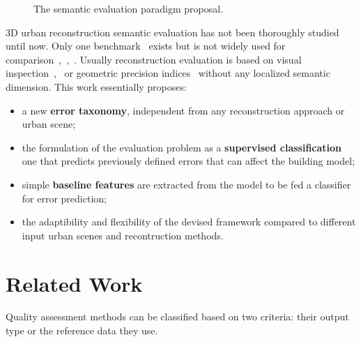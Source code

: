 \documentclass[runningheads]{llncs}
\begin{document}
    \begin{figure}
        \begin{center}
            
            \caption{\label{fig::pipeline} The semantic evaluation paradigm proposal. }
        \end{center}
    \end{figure}

     3D urban reconstruction semantic evaluation has not been thoroughly studied until now. Only one benchmark~\cite{rottensteiner2014results} exists but is not widely used for comparison~\cite{Lafarge2012},~\cite{nguatem2017modeling},~\cite{li2016boxfitting}. Usually reconstruction evaluation is based on visual inspection~\cite{Durupt2006},~\cite{MacayMoreia2013} or geometric precision indices~\cite{Kaartinen2005} without any localized semantic dimension. This work essentially proposes:
    \begin{itemize}
        \item a new \textbf{error taxonomy}, independent from any reconstruction approach or urban scene;
        \item the formulation of the evaluation problem as a \textbf{supervised classification} one that predicts previously defined errors that can affect the building model;
        \item simple \textbf{baseline features} are extracted from the model to be fed a classifier for error prediction;
        \item the adaptibility and flexibility of the devised framework compared to different input urban scenes and recontruction methods.
    \end{itemize}

\section{Related Work}

Quality assessment methods can be classified based on two criteria: their output type or the reference data they use.
\end{document}
